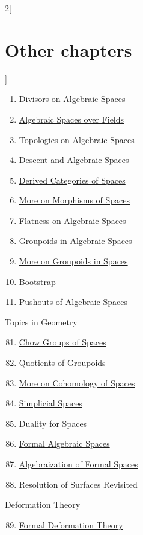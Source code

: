 \begin{multicols}{2}[\section{Other chapters}]
\begin{enumerate}
\item \hyperref[spaces-divisors-section-phantom]{Divisors on Algebraic Spaces}
\item \hyperref[spaces-over-fields-section-phantom]{Algebraic Spaces over Fields}
\item \hyperref[spaces-topologies-section-phantom]{Topologies on Algebraic Spaces}
\item \hyperref[spaces-descent-section-phantom]{Descent and Algebraic Spaces}
\item \hyperref[spaces-perfect-section-phantom]{Derived Categories of Spaces}
\item \hyperref[spaces-more-morphisms-section-phantom]{More on Morphisms of Spaces}
\item \hyperref[spaces-flat-section-phantom]{Flatness on Algebraic Spaces}
\item \hyperref[spaces-groupoids-section-phantom]{Groupoids in Algebraic Spaces}
\item \hyperref[spaces-more-groupoids-section-phantom]{More on Groupoids in Spaces}
\item \hyperref[bootstrap-section-phantom]{Bootstrap}
\item \hyperref[spaces-pushouts-section-phantom]{Pushouts of Algebraic Spaces}
\end{enumerate}
Topics in Geometry
\begin{enumerate}
\setcounter{enumi}{80}
\item \hyperref[spaces-chow-section-phantom]{Chow Groups of Spaces}
\item \hyperref[groupoids-quotients-section-phantom]{Quotients of Groupoids}
\item \hyperref[spaces-more-cohomology-section-phantom]{More on Cohomology of Spaces}
\item \hyperref[spaces-simplicial-section-phantom]{Simplicial Spaces}
\item \hyperref[spaces-duality-section-phantom]{Duality for Spaces}
\item \hyperref[formal-spaces-section-phantom]{Formal Algebraic Spaces}
\item \hyperref[restricted-section-phantom]{Algebraization of Formal Spaces}
\item \hyperref[spaces-resolve-section-phantom]{Resolution of Surfaces Revisited}
\end{enumerate}
Deformation Theory
\begin{enumerate}
\setcounter{enumi}{88}
\item \hyperref[formal-defos-section-phantom]{Formal Deformation Theory}

\end{enumerate}
\end{multicols}
